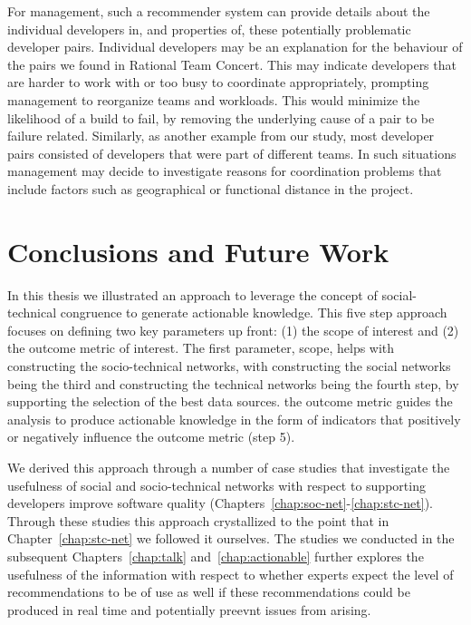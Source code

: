 For management, such a recommender system can provide details about the
individual developers in, and properties of, these potentially problematic
developer pairs. Individual developers may be an explanation for the behaviour of
the pairs we found in Rational Team Concert. This may indicate developers that are
harder to work with or too busy to coordinate appropriately, prompting management
to reorganize teams and workloads. This would minimize the likelihood of a build
to fail, by removing the underlying cause of a pair to be failure related.
Similarly, as another example from our study, most developer pairs
consisted of developers that were part of different teams. In such
situations management may decide to investigate reasons for coordination
problems that include factors such as geographical or functional distance in the project.




\section{Conclusions and Future Work}
\label{ch:dis:con}
In this thesis we illustrated an approach to leverage the concept of social-technical congruence to generate actionable knowledge.
This five step approach focuses on defining two key parameters up front: (1) the scope of interest and (2) the outcome metric of interest.
The first parameter, scope, helps with constructing the socio-technical networks, with constructing the social networks being the third and constructing the technical networks being the fourth step, by supporting the selection of the best data sources.
the outcome metric guides the analysis to produce actionable knowledge in the form of indicators that positively or negatively influence the outcome metric (step 5). 

We derived this approach through a number of case studies that investigate the usefulness of social and socio-technical networks with respect to supporting developers improve software quality (Chapters~\ref{chap:soc-net}-\ref{chap:stc-net}).
Through these studies this approach crystallized to the point that in Chapter~\ref{chap:stc-net} we followed it ourselves.
The studies we conducted in the subsequent Chapters~\ref{chap:talk} and~\ref{chap:actionable} further explores the usefulness of the information with respect to whether experts expect the level of recommendations to be of use as well if these recommendations could be produced in real time and potentially preevnt issues from arising.

